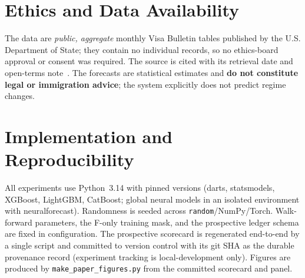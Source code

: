 \documentclass[runningheads]{llncs}
\begin{document}
\section*{Ethics and Data Availability}
\label{sec:ethics}

The data are \emph{public, aggregate} monthly Visa Bulletin tables published by the
U.S. Department of State; they contain no individual records, so no ethics-board
approval or consent was required. The source is cited with its retrieval date and
open-terms note~\cite{statedept}. The forecasts are statistical estimates and
\textbf{do not constitute legal or immigration advice}; the system explicitly does
not predict regime changes. %

\appendix
\section{Implementation and Reproducibility}
\label{sec:repro}

All experiments use Python~3.14 with pinned versions (darts, statsmodels, XGBoost,
LightGBM, CatBoost; global neural models in an isolated environment with
neuralforecast). Randomness is seeded across \texttt{random}/NumPy/Torch. Walk-forward
parameters, the F-only training mask, and the prospective ledger schema are fixed in
configuration. The prospective scorecard is regenerated end-to-end by a single
script and committed to version control with its git SHA as the durable provenance
record (experiment tracking is local-development only). Figures are produced by
\texttt{make\_paper\_figures.py} from the committed scorecard and panel.
\end{document}

